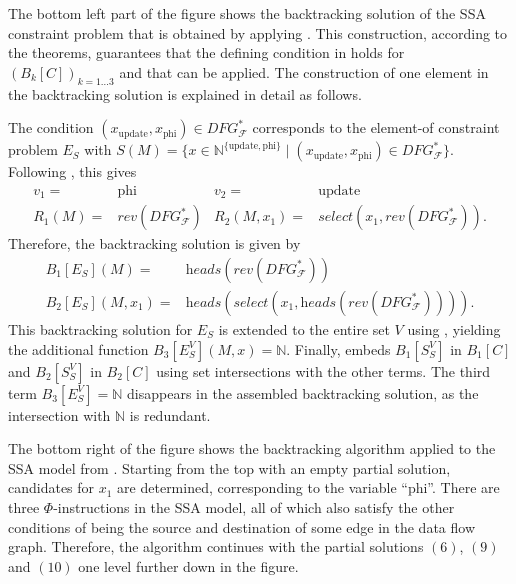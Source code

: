     The bottom left part of the figure shows the backtracking solution
    of the SSA constraint problem that is obtained by applying
    .
    This construction, according to the theorems, guarantees that the defining
    condition in  holds for $(B_k[C])_{k=1\dots3}$ and
    that  can be applied.
    The construction of one element in the backtracking solution is
    explained in detail as follows.

    The condition $(x_\text{update},x_\text{phi})\in DFG_\mathcal F^*$
    corresponds to the \mbox{element-of} constraint problem $E_S$ with
    $S(M)=\{x\in\mathbb N^{\{\text{update},\text{phi}\}}\mid (x_\text{update},x_\text{phi})\in DFG_\mathcal F^*\}$.
    Following , this gives
    \begin{align*}
    v_1={}&\text{phi}&v_2={}&\text{update}\\
    R_1(M)={}&\textit{rev}(DFG_\mathcal F^*)&
    R_2(M,x_1)={}&\textit{select}(x_1,rev(DFG_\mathcal F^*)).
    \end{align*}
    Therefore, the backtracking solution is given by
    \begin{align*}
        B_1[E_S](M)={}&\textit{heads}(\textit{rev}(DFG_\mathcal F^*))\\
        B_2[E_S](M,x_1)={}&\textit{heads}(\textit{select}(x_1,\textit{heads}(\textit{rev}(DFG_\mathcal F^*)))).
    \end{align*}
    This backtracking solution for $E_S$ is extended to the entire set $V$ using
    , yielding the additional function
    $B_3[E_S^V](M,x)=\mathbb N$.
    Finally,  embeds $B_1[S_S^V]$ in $B_1[C]$ and
    $B_2[S_S^V]$ in $B_2[C]$ using set intersections with the other terms.
    The third term $B_3[E_S^V]=\mathbb N$ disappears in the assembled
    backtracking solution, as the intersection with $\mathbb N$ is redundant.

    The bottom right of the figure shows the backtracking algorithm applied to
    the SSA model from .
    Starting from the top with an empty partial solution, candidates for $x_1$
    are determined, corresponding to the variable ``phi''.
    There are three $\Phi$-instructions in the SSA model, all of which also
    satisfy the other conditions of being the source and destination of some
    edge in the data flow graph.
    Therefore, the algorithm continues with the partial solutions $(6)$,
    $(9)$ and $(10)$ one level further down in the figure.

